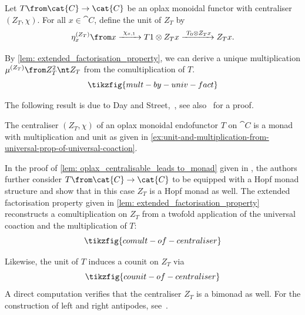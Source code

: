 \begin{example}\label{ex:unit-and-multiplication-from-universal-prop-of-universal-coaction}
  Let \(T \from \cat{C} \to \cat{C}\) be an oplax monoidal functor with centraliser \((Z_T, \chi)\).
  For all \(x \in \cat{C}\),
  define the unit of \(Z_T\) by
  \[
    \eta^{(Z_T)}_x \from x \xrightarrow{\ \chi_{x, 1}\ } T1 \otimes Z_T x \xrightarrow{\ T_0 \otimes Z_T x} Z_T x.
  \]

  By \cref{lem: extended_factorisation_property},
  we can derive a unique multiplication \(\mu^{(Z_T)} \from Z_T^2 \nt Z_T\) from the comultiplication of \(T\).
  \[
    \tikzfig{mult-by-univ-fact}
  \]
\end{example}

The following result is due to Day and Street,~\cite[191--192]{Day2007},
see also~\cite[Theorem~5.6]{Bruguieres2012} for a proof.

\begin{lemma}\label{lem: oplax_centralisable_leads to_monad}
  The centraliser \((Z_T, \chi)\)  of an oplax monoidal endofunctor \(T\) on \(\cat{C}\)
  is a monad with multiplication and unit as given in
  \cref{ex:unit-and-multiplication-from-universal-prop-of-universal-coaction}.
\end{lemma}

In the proof of \cref{lem: oplax_centralisable_leads to_monad} given in \cite[Theorem~5.6]{Bruguieres2012},
the authors further consider \(T \from \cat{C} \to \cat{C}\) to be equipped with a Hopf monad structure and show that in this case \(Z_T\) is a Hopf monad as well.
The extended factorisation property given in \cref{lem: extended_factorisation_property}
reconstructs a comultiplication on \(Z_T\)
from a twofold application of the universal coaction and the multiplication of \(T\):
\begin{equation}\label{eq:comult-of-centraliser}
  \tikzfig{comult-of-centraliser}
\end{equation}

Likewise, the unit of \(T\) induces a counit on \(Z_T\) via
\[
  \tikzfig{counit-of-centraliser}
\]
A direct computation verifies that the centraliser \(Z_T\) is a bimonad as well.
For the construction of left and right antipodes, see~\cite[Theorem~5.6]{Bruguieres2012}.

